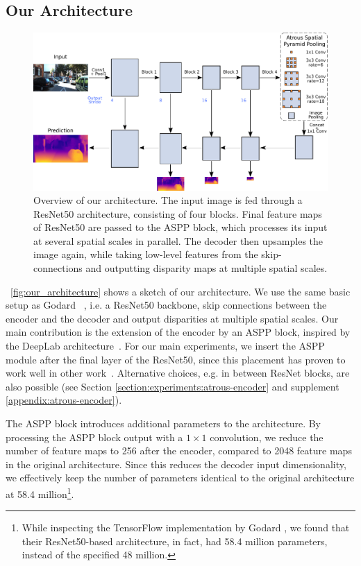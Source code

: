 \subsection{Our Architecture}
\begin{figure}
\begin{center}
    \includegraphics[width=0.9\linewidth]{images/architecture/architecture.pdf}
\end{center}
    \caption{Overview of our architecture.
    The input image is fed through a ResNet50 architecture, consisting of four blocks.
    Final feature maps of ResNet50 are passed to the ASPP block, which processes its input at several spatial scales in parallel.
    The decoder then upsamples the image again, while taking low-level features from the skip-connections and outputting disparity maps at multiple spatial scales.}
    \label{fig:our_architecture}
\label{fig:short}
\end{figure}
\figurename~\ref{fig:our_architecture} shows a sketch of our architecture.
We use the same basic setup as Godard \etal~\cite{Godard_2017_CVPR}, i.e. a ResNet50 backbone, skip connections between the encoder and the decoder and output disparities at multiple spatial scales.
Our main contribution is the extension of the encoder by an ASPP block, inspired by the DeepLab architecture~\cite{chen2018deeplab}. For our main experiments, we insert the ASPP module after the final layer of the ResNet50, since this placement has proven to work well in other work~\cite{chen2018encoder, Fu2018}. Alternative choices, e.g. in between ResNet blocks, are also possible (see Section \ref{section:experiments:atrous-encoder} and supplement \ref{appendix:atrous-encoder}).

The ASPP block introduces additional parameters to the architecture.
By processing the ASPP block output with a $1\times 1$ convolution, we reduce the number of feature maps to 256 after the encoder, compared to 2048 feature maps in the original architecture.
Since this reduces the decoder input dimensionality, we effectively keep the number of parameters identical to the original architecture at 58.4 million\footnote{While inspecting the TensorFlow implementation by Godard \etal, we found that their ResNet50-based architecture, in fact, had 58.4 million parameters, instead of the specified 48 million.}.




